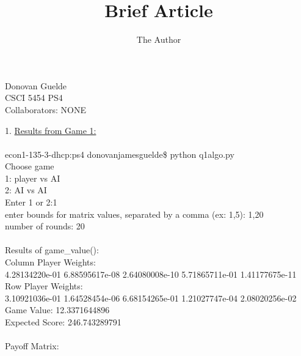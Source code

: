 \documentclass[11pt, oneside]{article}   	%
\title{Brief Article}
\author{The Author}
\begin{document}
\begin{flushright}
Donovan Guelde\\
CSCI 5454 PS4\\
Collaborators: NONE\\
\end{flushright}
1.  \underline{Results from Game 1:}\\\\
econ1-135-3-dhcp:ps4 donovanjamesguelde\$ python q1algo.py\\
Choose game\\
1: player vs AI\\
2: AI vs AI\\
Enter 1 or 2:1\\
enter bounds for matrix values, separated by a comma (ex: 1,5): 1,20\\
number of rounds: 20\\
\\
Results of game\_value():\\
Column Player Weights:\\
\indent 4.28134220e-01   6.88595617e-08   2.64080008e-10   5.71865711e-01   1.41177675e-11\\
Row Player Weights:\\
\indent 3.10921036e-01   1.64528454e-06   6.68154265e-01   1.21027747e-04   2.08020256e-02\\
Game Value: 12.3371644896\\
Expected Score: 246.743289791\\
\\
Payoff Matrix:\\
\end{document}
